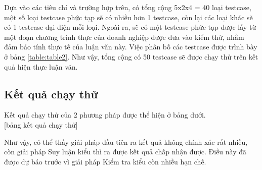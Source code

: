Dựa vào các tiêu chí và trường hợp trên, có tổng cộng 5x2x4 = 40 loại testcase, một số loại testcase phức tạp sẽ có nhiều hơn 1 testcase, còn lại các loại khác sẽ có 1 testcase đại diện mỗi loại. Ngoài ra, sẽ có một testcase phức tạp được lấy từ một đoạn chương trình thực của doanh nghiệp được đưa vào kiểm thử, nhằm đảm bảo tính thực tế của luận văn này. Việc phân bố các testcase được trình bày ở bảng \ref{table:table2}. Như vậy, tổng cộng có 50 testcase sẽ được chạy thử trên kết quả hiện thực luận văn.\\

\subsection{Kết quả chạy thử}

Kết quả chạy thử của 2 phương pháp được thể hiện ở bảng dưới.\\

[bảng kết quả chạy thử]

Như vậy, có thể thấy giải pháp đầu tiên ra kết quả không chính xác rất nhiều, còn giải pháp Suy luận kiểu thì ra được kết quả chấp nhận được. Điều này đã được dự báo trước vì giải pháp Kiểm tra kiểu còn nhiều hạn chế.\\
